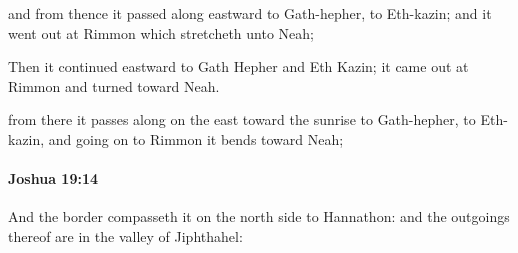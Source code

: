 			\begin{versebox}
					\item[BHS] 
					\item[ASV] and from thence it passed along eastward to Gath-hepher, to Eth-kazin; and it went out at Rimmon which stretcheth unto Neah;
					\item[NIV] Then it continued eastward to Gath Hepher and Eth Kazin; it came out at Rimmon and turned toward Neah.
					\item[NRSV] from there it passes along on the east toward the sunrise to Gath-hepher, to Eth-kazin, and going on to Rimmon it bends toward Neah;
			\end{versebox}

		\paragraph{Joshua 19:14} %
			\label{JOSHUA-19-14}

			And the border compasseth it on the north side to Hannathon: and the outgoings thereof are in the valley of Jiphthahel:


